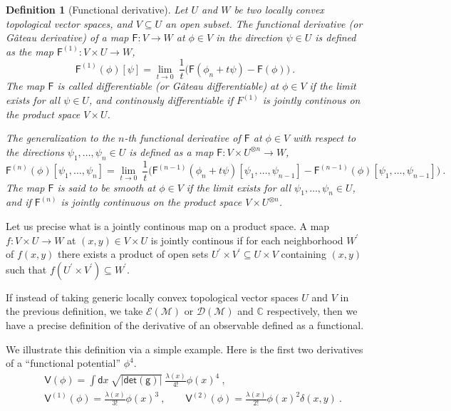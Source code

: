 \documentclass[10pt]{book}
\newcommand{\abs}[1]{\left|#1\right|}
\renewcommand{\det}{\mathsf{det}}
\let\int\int
\newcommand{\Dcal}{\mathcal{D}}
\newcommand{\Ecal}{\mathcal{E}}
\newcommand{\Mcal}{\mathcal{M}}
\newcommand{\Cbb}{\mathbb{C}}
\newcommand{\Fsf}{\mathsf{F}}
\newcommand{\Vsf}{\mathsf{V}}
\newcommand{\dsf}{\mathsf{d}}
\newcommand{\gsf}{\mathsf{g}}
\theoremstyle{break}
\newtheorem{definition}{Definition}
\begin{document}
\begin{definition}[Functional derivative]\label{def:functional_derivative}
Let $U$ and $W$ be two locally convex topological vector spaces, and $V \subseteq U$ an open subset. The functional derivative (or Gâteau derivative) of a map $\Fsf:  V \to W$ at $\phi \in V$ in the direction $\psi \in U$ is defined as the map $\Fsf^{(1)} : V \times U \to W$,
%
\begin{equation*}
\Fsf^{(1)}(\phi)[\psi] = \lim_{t \to 0} \ \frac{1}{t} \bigg( \Fsf(\phi_n + t \psi) - \Fsf(\phi) \bigg) \ .
\end{equation*}
% 
The map $\Fsf$ is called differentiable (or Gâteau differentiable) at $\phi \in V$ if the limit exists for all $\psi \in U$, and continously differentiable if $F^{(1)}$ is jointly continous on the product space $V \times U$.\par%
%
%
The generalization to the $n$-th functional derivative of $\Fsf$ at $\phi \in V$ with respect to the directions $\psi_1, \dots, \psi_n \in U$ is defined as a map $\Fsf : V \times U^{\otimes n} \to W$,
%
\begin{equation*}%
\Fsf^{(n)}(\phi)[\psi_1,\dots ,\psi_n] = \lim_{t \to 0} \ \frac{1}{t} \bigg( \Fsf^{(n-1)}(\phi_n + t \psi)[\psi_1,\dots ,\psi_{n-1}] - \Fsf^{(n-1)}(\phi)[\psi_1,\dots ,\psi_{n-1}] \bigg) \ .
\end{equation*}
%
The map $\Fsf$ is said to be smooth at $\phi \in V$ if the limit exists for all $\psi_1, \dots, \psi_n \in U$, and if $\Fsf^{(n)}$ is jointly continuous on the product space $V \times U^{\otimes n}$.
\end{definition}


Let us precise what is a jointly continous map on a product space. A map $f : V \times U \to W$ at $(x,y) \in V \times U$ is jointly continous if for each neighborhood $W^\prime$ of $f(x,y)$ there exists a product of open sets $U^\prime \times V^\prime \subseteq U \times V$ containing $(x,y)$ such that $f(U^\prime \times V^\prime) \subseteq W^\prime$.


\bigskip


If instead of taking generic locally convex topological vector spaces $U$ and $V$ in the previous definition, we take $\Ecal(\Mcal)$ or $\Dcal(\Mcal)$ and $\Cbb$ respectively, then we have a precise definition of the derivative of an observable defined as a functional.


\bigskip


We illustrate this definition via a simple example. Here is the first two derivatives of a ``functional potential'' $\phi^4$. 
%
\begin{eqnarray*}
&& \Vsf(\phi) = \int \dsf x \ \sqrt{\abs{\det(\gsf)}} \ \frac{\lambda(x)}{4!} \phi(x)^4 \ ,\\
%
&& \Vsf^{(1)}(\phi) = \frac{\lambda(x)}{3!} \phi(x)^3 \ , \qquad
%
\Vsf^{(2)}(\phi) = \frac{\lambda(x)}{2!} \phi(x)^2 \delta(x,y) \ .
\end{eqnarray*}
\end{document}
